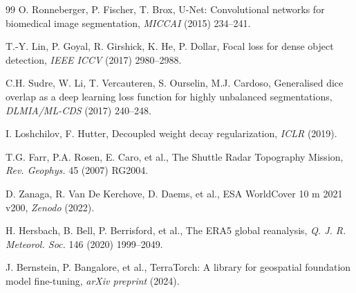 \documentclass[review,12pt]{elsarticle}
\begin{document}
\begin{thebibliography}{99}
O. Ronneberger, P. Fischer, T. Brox,
U-Net: Convolutional networks for biomedical image segmentation,
\textit{MICCAI} (2015) 234--241.

T.-Y. Lin, P. Goyal, R. Girshick, K. He, P. Dollar,
Focal loss for dense object detection,
\textit{IEEE ICCV} (2017) 2980--2988.

C.H. Sudre, W. Li, T. Vercauteren, S. Ourselin, M.J. Cardoso,
Generalised dice overlap as a deep learning loss function for highly unbalanced segmentations,
\textit{DLMIA/ML-CDS} (2017) 240--248.

I. Loshchilov, F. Hutter,
Decoupled weight decay regularization,
\textit{ICLR} (2019).

T.G. Farr, P.A. Rosen, E. Caro, et al.,
The Shuttle Radar Topography Mission,
\textit{Rev. Geophys.} 45 (2007) RG2004.

D. Zanaga, R. Van De Kerchove, D. Daems, et al.,
ESA WorldCover 10 m 2021 v200,
\textit{Zenodo} (2022).

H. Hersbach, B. Bell, P. Berrisford, et al.,
The ERA5 global reanalysis,
\textit{Q. J. R. Meteorol. Soc.} 146 (2020) 1999--2049.

J. Bernstein, P. Bangalore, et al.,
TerraTorch: A library for geospatial foundation model fine-tuning,
\textit{arXiv preprint} (2024).

\end{thebibliography}
\end{document}
